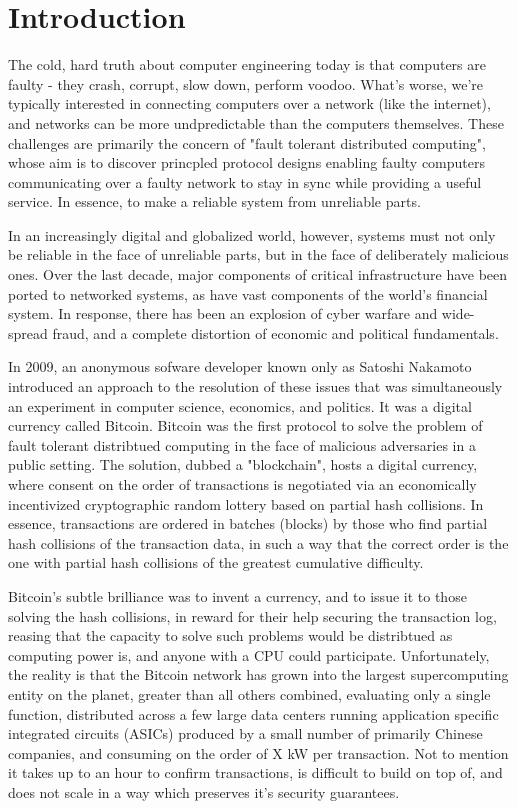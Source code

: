\chapter{Introduction}

The cold, hard truth about computer engineering today is that computers are faulty - 
they crash, corrupt, slow down, perform voodoo. 
What's worse, we're typically interested in connecting computers over a network (like the internet),
and networks can be more undpredictable than the computers themselves.
These challenges are primarily the concern of "fault tolerant distributed computing",
whose aim is to discover princpled protocol designs enabling faulty computers communicating over a faulty network 
to stay in sync while providing a useful service.
In essence, to make a reliable system from unreliable parts.

In an increasingly digital and globalized world, however, 
systems must not only be reliable in the face of unreliable parts, but in the face of deliberately malicious ones.
Over the last decade, major components of critical infrastructure have been ported to networked systems,
as have vast components of the world's financial system.
In response, there has been an explosion of cyber warfare and wide-spread fraud,
and a complete distortion of economic and political fundamentals.

In 2009, an anonymous sofware developer known only as Satoshi Nakamoto introduced an approach to the resolution of these issues that was simultaneously an experiment in computer science, 
economics, and politics. 
It was a digital currency called Bitcoin.
Bitcoin was the first protocol to solve the problem of fault tolerant distribtued computing in the face of malicious adversaries in a public setting.
The solution, dubbed a "blockchain", hosts a digital currency, 
where consent on the order of transactions is negotiated via an economically incentivized cryptographic random lottery based on partial hash collisions.
In essence, transactions are ordered in batches (blocks) by those who find partial hash collisions of the transaction data, 
in such a way that the correct order is the one with partial hash collisions of the greatest cumulative difficulty.

Bitcoin's subtle brilliance was to invent a currency, and to issue it to those solving the hash collisions, in reward for their help securing the transaction log,
reasing that the capacity to solve such problems would be distribtued as computing power is, and anyone with a CPU could participate.
Unfortunately, the reality is that the Bitcoin network has grown into the largest supercomputing entity on the planet, greater than all others combined,
evaluating only a single function, distributed across a few large data centers running application specific integrated circuits (ASICs) produced by a small number of primarily Chinese companies, and consuming on the order of X kW per transaction.
Not to mention it takes up to an hour to confirm transactions, is difficult to build on top of, and does not scale in a way which preserves it's security guarantees.

